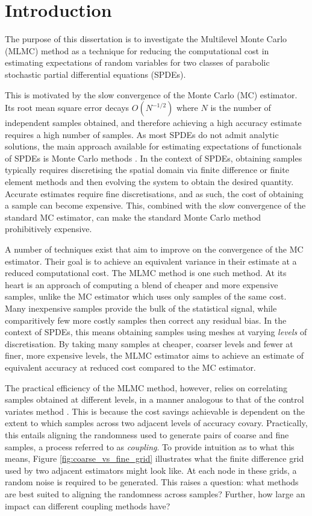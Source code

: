 \chapter{Introduction}\label{sec:intro}

The purpose of this dissertation is to investigate the 
Multilevel Monte Carlo (MLMC) method as a technique for reducing 
the computational cost in estimating expectations of random variables 
for two classes of parabolic stochastic partial differential equations (SPDEs).

This is motivated by the slow convergence of the Monte Carlo 
(MC) estimator. Its root mean square error 
decays $O(N^{-1/2})$ where $N$ is the number 
of independent samples obtained, and therefore achieving a high accuracy 
estimate requires a high number of samples. As most SPDEs do not admit 
analytic solutions, the main approach available for estimating expectations of 
functionals of SPDEs is Monte Carlo methods \cite{giles2015multilevel}. In the context
of SPDEs, obtaining samples typically requires discretising 
the spatial domain via finite difference or finite element methods
and then evolving the system to obtain the desired quantity. Accurate 
estimates require fine discretisations, and as such, the cost of obtaining 
a sample can become expensive. This, combined with the slow convergence of the 
standard MC estimator, can make the standard Monte Carlo method prohibitively
expensive.

A number of techniques exist that aim to improve on the convergence of 
the MC estimator. Their goal is to achieve an equivalent variance in their estimate 
at a reduced computational cost. The MLMC method is one such method. 
At its heart is an approach of computing a blend of cheaper and more expensive
samples, unlike the MC estimator which uses only samples of the same cost.
Many inexpensive samples provide the bulk of the statistical signal, 
while comparitively few more costly samples then correct any residual bias.
In the context of SPDEs, this means obtaining samples using meshes at 
varying \textit{levels} of discretisation. By taking many samples at cheaper,
coarser levels and fewer at finer, more expensive levels, the MLMC 
estimator aims to achieve an estimate of equivalent accuracy at reduced cost
compared to the MC estimator.

The practical efficiency of the MLMC method, however, relies on correlating 
samples obtained at different levels, in a manner analogous to that of the 
control variates method \cite{giles2015multilevel}. 
This is because the cost savings achievable is dependent on the extent to which 
samples across two adjacent levels of accuracy covary. Practically, this 
entails aligning the randomness used to generate pairs of coarse and 
fine samples, a process referred to as \textit{coupling}.
To provide intuition as to what this means, Figure
\ref{fig:coarse_vs_fine_grid} illustrates what the finite difference 
grid used by two adjacent estimators might look like. At each 
node in these grids, a random noise is required to be generated. 
This raises a question: what methods are best suited to aligning the 
randomness across samples? Further, how large an impact 
can different coupling methods have?

